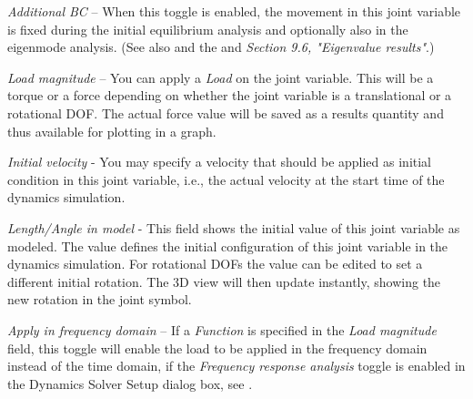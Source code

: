 \begin{bulletlist}
\item{\sl Additional BC} --
  When this toggle is enabled, the movement in this joint variable is fixed
  during the initial equilibrium analysis and optionally also in the eigenmode
  analysis. (See also
  and the 
  and {\sl Section 9.6, "Eigenvalue results"}.)

\item{\sl Load magnitude} --
  You can apply a {\sl Load} on the joint variable.
  This will be a torque or a force depending on whether the joint variable
  is a translational or a rotational DOF. The actual force value will be saved
  as a results quantity and thus available for plotting in a graph.

\item
  {\sl Initial velocity} - You may specify a velocity that should be
  applied as initial condition in this joint variable, i.e., the actual
  velocity at the start time of the dynamics simulation.

\item
  {\sl Length/Angle in model} - This field shows the initial value of
  this joint variable as modeled. The value defines the initial
  configuration of this joint variable in the dynamics simulation. For
  rotational DOFs the value can be edited to set a different initial rotation. The 3D view
  will then update instantly, showing the new rotation in the joint
  symbol.
\item
  {\sl Apply in frequency domain} -- If a {\sl Function} is specified
  in the {\sl Load magnitude} field, this toggle will enable the load
  to be applied in the frequency domain instead of the time domain, if
  the {\sl Frequency response analysis} toggle is enabled in the
  Dynamics Solver Setup dialog box, see
  .
\end{bulletlist}

